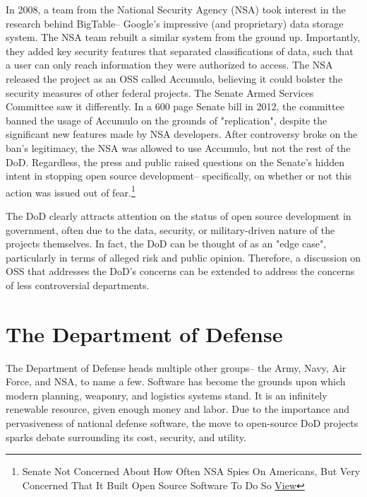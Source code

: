 \documentclass[a4paper]{article}
\begin{document}
In 2008, a team from the National Security Agency (NSA) took interest in the research behind BigTable– Google's impressive (and proprietary) data storage system. The NSA team rebuilt a similar system from the ground up. Importantly, they added key security features that separated classifications of data, such that a user can only reach information they were authorized to access. The NSA released the project as an OSS called Accumulo, believing it could bolster the security measures of other federal projects. The Senate Armed Services Committee saw it differently. In a 600 page Senate bill in 2012, the committee banned the usage of Accumulo on the grounds of "replication", despite the significant new features made by NSA developers. After controversy broke on the ban's legitimacy, the NSA was allowed to use Accumulo, but not the rest of the DoD. Regardless, the press and public raised questions on the Senate's hidden intent in stopping open source development– specifically, on whether or not this action was issued out of fear.\footnote{Senate Not Concerned About How Often NSA Spies On Americans, But Very Concerned That It Built Open Source Software To Do So \href{https://www.techdirt.com/articles/20120717/16542919736/senate-not-concerned-about-how-often-nsa-spies-americans-very-concerned-that-it-built-open-source-software-to-do-so.shtml}{View}}

	The DoD clearly attracts attention on the status of open source development in government, often due to the data, security, or military-driven nature of the projects themselves. In fact, the DoD can be thought of as an "edge case", particularly in terms of alleged risk and public opinion. Therefore, a discussion on OSS that addresses the DoD's concerns can be extended to address the concerns of less controversial departments.

\section*{The Department of Defense}

\qquad The Department of Defense heads multiple other groups– the Army, Navy, Air Force, and NSA, to name a few. Software has become the grounds upon which modern planning, weaponry, and logistics systems stand. It is an infinitely renewable resource, given enough money and labor. Due to the importance and pervasiveness of national defense software, the move to open-source DoD projects sparks debate surrounding its cost, security, and utility.
\end{document}
